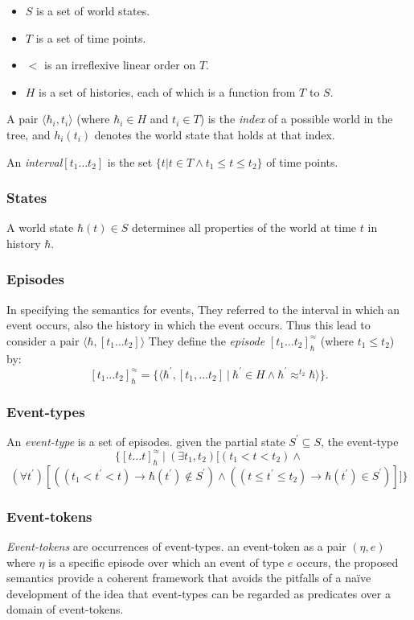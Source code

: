 \begin{itemize}
	\item $S$ is a set of world states.
	\item $T$ is a set of time points.
	\item $<$ is an irreflexive linear order on $T$.
	\item $H$ is a set of histories, each of which is a function from $T$ to $S$.
\end{itemize}

A pair $\langle \hbar_i, t_i \rangle$ (where $\hbar_i \in H$ and $t_i \in T$) is the \textit{index} of a possible world in the tree, and $h_i(t_i)$ denotes the world state that holds at that index.

An \textit{interval}$[t_1 \dots t_2]$ is the set $\{ t | t \in T \land t_1 \leq t \leq t_2\}$ of time points.


\subsubsection{States}
A world state $\hbar(t) \in S$ determines all properties of the world at time $t$ in history $\hbar$.

\subsubsection{Episodes}
In specifying the semantics for events, They referred to the interval in which an event occurs, also the history in which the event occurs.
Thus this lead to consider a pair $\langle \hbar, [t_1 \dots t_2] \rangle$
They define the \textit{episode} $[t_1 \dots t_2]_{\hbar}^{\approx}$ (where $t_1 \leq t_2$) by:
\[
	[t_1 \dots t_2]_{\hbar}^{\approx} = \{\langle \hbar^{\prime}, [t_1, \dots t_2] \ | \  \hbar^{\prime} \in H \land \hbar^{\prime} \approx^{t_2} \hbar \rangle\}.
\]

\subsubsection{Event-types}
An \textit{event-type} is a set of episodes. given the partial state $S^{\prime} \subseteq S$, the event-type
\[
	\{
	[t \dots t]_{\hbar}^{\approx} \ | \ (\exists t_1, t_2) [
			(t_1 < t < t_2) \land
			\]
			\[
			(\forall t^{\prime})[
					((t_1 < t^{\prime} < t) \to \hbar(t^{\prime}) \not\in S^{\prime}) \land
					((t \leq t^{\prime} \leq t_2) \to \hbar(t^{\prime}) \in S^{\prime})
				]
		]
	\}
\]

\subsubsection{Event-tokens}
\textit{Event-tokens} are occurrences of event-types.
an event-token as a pair $(\eta, e)$ where $\eta$ is a specific episode over which an event of type $e$ occurs, the proposed semantics provide a coherent framework that avoids the pitfalls of a naïve development of the idea that event-types can be regarded as predicates over a domain of event-tokens.

